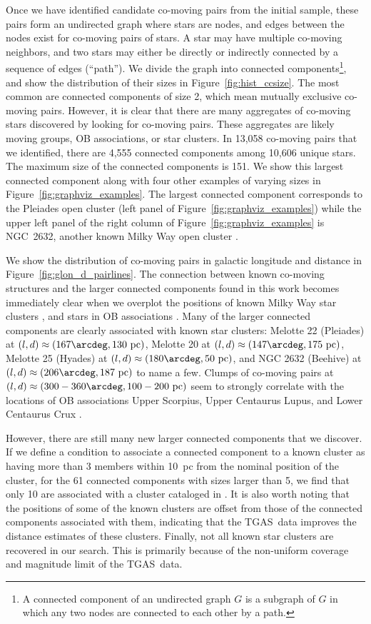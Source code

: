 \documentclass[manuscript, letterpaper]{aastex6}
\newcommand{\acronym}[1]{{\small{#1}}}
\newcommand{\tgas}{\acronym{TGAS}}
\begin{document}
Once we have identified candidate co-moving pairs from the initial
sample, these pairs form an undirected graph where stars are nodes, and edges
between the nodes exist for co-moving pairs of stars.
A star may have multiple co-moving neighbors, and two stars may either
be directly or indirectly connected by a sequence of edges (``path'').
We divide the graph into connected components\footnote{A connected component of an undirected graph $G$
is a subgraph of $G$ in which any two nodes are connected to each other by a path.},
and show the distribution of their sizes in Figure~\ref{fig:hist_ccsize}.
The most common are connected components of size 2, which mean mutually exclusive co-moving
pairs. However, it is clear that there are many aggregates of co-moving stars
discovered by looking for co-moving pairs.
These aggregates are likely moving groups, OB associations, or star clusters.
In 13,058 co-moving pairs that we identified,
there are 4,555 connected components among 10,606 unique stars.
The maximum size of the connected components is 151.
We show this largest connected component along with four other
examples of varying sizes in Figure~\ref{fig:graphviz_examples}.
The largest connected component corresponds to the Pleiades open cluster (left panel of Figure~\ref{fig:graphviz_examples})
while the upper left panel of the right column of Figure~\ref{fig:graphviz_examples}
is NGC~2632, another known Milky Way open cluster \citep{Kharchenko:2016aa}.

We show the distribution of co-moving pairs in galactic longitude and
distance in Figure~\ref{fig:glon_d_pairlines}.
The connection between known co-moving structures and
the larger connected components found in this work becomes immediately clear when
we overplot the positions of known Milky Way star clusters \citep{Kharchenko:2016aa},
and stars in OB associations \citep{de-Zeeuw:1999aa}.
Many of the larger connected components are
clearly associated with known star clusters:
Melotte 22 (Pleiades) at $(l,d)\approx (167\arcdeg, 130~\textrm{pc})$,
Melotte 20 at $(l,d)\approx (147\arcdeg, 175~\textrm{pc})$,
Melotte 25 (Hyades) at $(l,d)\approx (180\arcdeg, 50~\textrm{pc})$, and
NGC 2632 (Beehive) at $(l,d)\approx (206\arcdeg, 187~\textrm{pc})$
to name a few.
Clumps of co-moving pairs at $(l,d)\approx (300-360\arcdeg, 100-200~\textrm{pc})$
seem to strongly correlate with the locations of OB associations
Upper Scorpius, Upper Centaurus Lupus, and Lower Centaurus Crux
\citep{de-Zeeuw:1999aa}.

However, there are still many new larger connected components that we
discover.
If we define a condition to associate a connected component to a known cluster
as having more than 3 members within 10~pc from the nominal position of
the cluster, for the 61 connected components with sizes larger than 5,
we find that only 10 are associated with a cluster cataloged in
\citet{Kharchenko:2016aa}.
It is also worth noting that the positions of some of the known clusters
are offset from those of the connected components associated with them,
indicating that the \tgas\ data improves the distance estimates of these clusters.
Finally, not all known star clusters are recovered in our search.
This is primarily because of the non-uniform coverage and magnitude limit of the
\tgas\ data.
\end{document}

